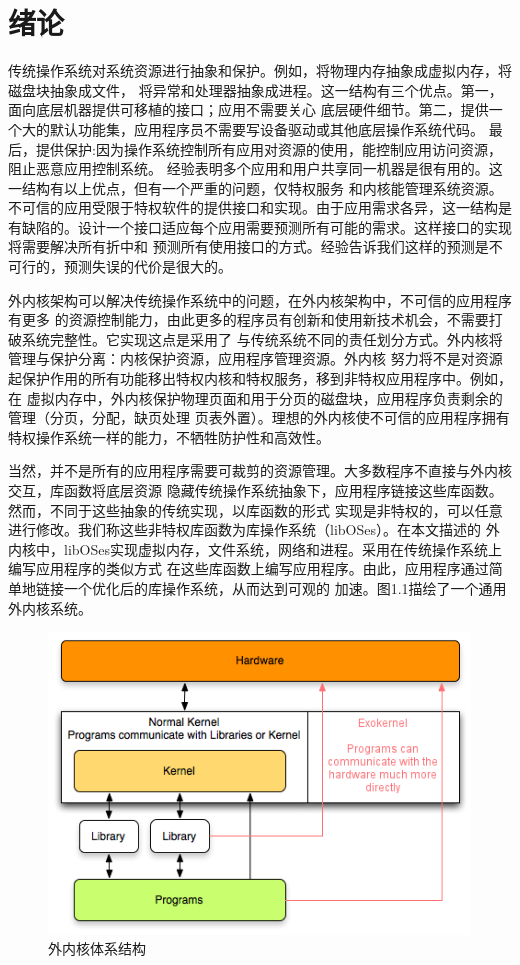 \documentclass[12pt,openany,a4paper]{report}
\begin{document}
\chapter{绪论}
	    传统操作系统对系统资源进行抽象和保护。例如，将物理内存抽象成虚拟内存，将磁盘块抽象成文件，
	将异常和处理器抽象成进程。这一结构有三个优点。第一，面向底层机器提供可移植的接口；应用不需要关心
        底层硬件细节。第二，提供一个大的默认功能集，应用程序员不需要写设备驱动或其他底层操作系统代码。
	最后，提供保护:因为操作系统控制所有应用对资源的使用，能控制应用访问资源，阻止恶意应用控制系统。
	经验表明多个应用和用户共享同一机器是很有用的。这一结构有以上优点，但有一个严重的问题，仅特权服务
	和内核能管理系统资源。不可信的应用受限于特权软件的提供接口和实现。由于应用需求各异，这一结构是
	有缺陷的。设计一个接口适应每个应用需要预测所有可能的需求。这样接口的实现将需要解决所有折中和
	预测所有使用接口的方式。经验告诉我们这样的预测是不可行的，预测失误的代价是很大的。\par
	    外内核架构可以解决传统操作系统中的问题，在外内核架构中，不可信的应用程序有更多
	的资源控制能力，由此更多的程序员有创新和使用新技术机会，不需要打破系统完整性。它实现这点是采用了
	与传统系统不同的责任划分方式。外内核将管理与保护分离：内核保护资源，应用程序管理资源。外内核
	努力将不是对资源起保护作用的所有功能移出特权内核和特权服务，移到非特权应用程序中。例如，在
	虚拟内存中，外内核保护物理页面和用于分页的磁盘块，应用程序负责剩余的管理（分页，分配，缺页处理
	页表外置）。理想的外内核使不可信的应用程序拥有特权操作系统一样的能力，不牺牲防护性和高效性。\par
	    当然，并不是所有的应用程序需要可裁剪的资源管理。大多数程序不直接与外内核交互，库函数将底层资源
	隐藏传统操作系统抽象下，应用程序链接这些库函数。然而，不同于这些抽象的传统实现，以库函数的形式
	实现是非特权的，可以任意进行修改。我们称这些非特权库函数为库操作系统（libOSes）。在本文描述的
	外内核中，libOSes实现虚拟内存，文件系统，网络和进程。采用在传统操作系统上编写应用程序的类似方式
	在这些库函数上编写应用程序。由此，应用程序通过简单地链接一个优化后的库操作系统，从而达到可观的
	加速。图1.1描绘了一个通用外内核系统。\par
	
	\begin{figure}[htb]
		\centering
		\includegraphics[height=8cm]{Exokernel_revised.png}
		\caption[外内核体系结构]{外内核体系结构}
	\end{figure}
\end{document}
